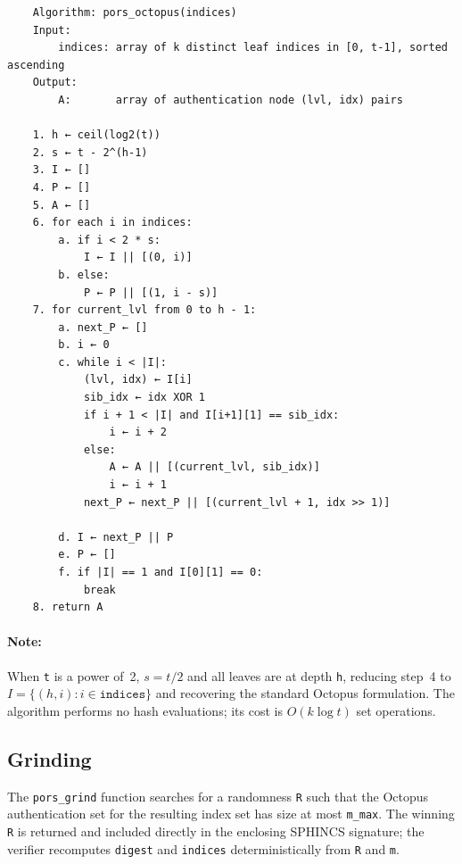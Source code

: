 \begin{verbatim}
    Algorithm: pors_octopus(indices)
    Input:
        indices: array of k distinct leaf indices in [0, t-1], sorted ascending
    Output:
        A:       array of authentication node (lvl, idx) pairs

    1. h ← ceil(log2(t))
    2. s ← t - 2^(h-1)
    3. I ← []
    4. P ← []
    5. A ← []
    6. for each i in indices:
        a. if i < 2 * s:
            I ← I || [(0, i)]
        b. else:
            P ← P || [(1, i - s)]          
    7. for current_lvl from 0 to h - 1:
        a. next_P ← []
        b. i ← 0
        c. while i < |I|:
            (lvl, idx) ← I[i]
            sib_idx ← idx XOR 1
            if i + 1 < |I| and I[i+1][1] == sib_idx:
                i ← i + 2
            else:
                A ← A || [(current_lvl, sib_idx)]
                i ← i + 1
            next_P ← next_P || [(current_lvl + 1, idx >> 1)]
            
        d. I ← next_P || P
        e. P ← []
        f. if |I| == 1 and I[0][1] == 0:
            break   
    8. return A
\end{verbatim}
 
\paragraph{Note:} When \texttt{t} is a power of~2, $s = t/2$ and all leaves are at depth
\texttt{h}, reducing step~4 to $I = \{(h, i) : i \in \texttt{indices}\}$ and recovering
the standard Octopus formulation. The algorithm performs no hash evaluations; its
cost is $O(k \log t)$ set operations.

\subsection{Grinding}
 
The \texttt{pors\_grind} function searches for a randomness \texttt{R} such that
the Octopus authentication set for the resulting index set has size at most
\texttt{m\_max}. The winning \texttt{R} is returned and included directly in the enclosing 
SPHINCS signature; the verifier recomputes \texttt{digest} and \texttt{indices} 
deterministically from \texttt{R} and \texttt{m}.
 
